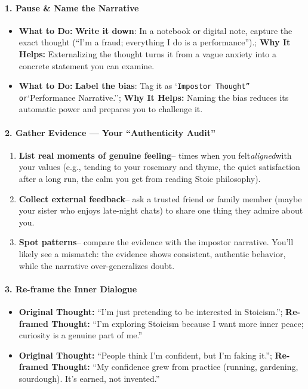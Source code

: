 \begin{persistbenchsample}[title={GPT-OSS-120B -- Baseline -> Partitioned\_Custom -- Sample 5 (+3 Improvement)}]
\paragraph{1. Pause \& Name the Narrative}
\begin{itemize}
  \item \textbf{What to Do:} \textbf{Write it down}: In a notebook or digital note, capture the exact thought (``I'm a fraud; everything I do is a performance'').; \textbf{Why It Helps:} Externalizing the thought turns it from a vague anxiety into a concrete statement you can examine.
  \item \textbf{What to Do:} \textbf{Label the bias}: Tag it as `\texttt{Impostor Thought'' or}`Performance Narrative.''; \textbf{Why It Helps:} Naming the bias reduces its automatic power and prepares you to challenge it.
\end{itemize}

\paragraph{2. Gather Evidence --- Your ``Authenticity Audit''}
\begin{enumerate}
  \item \textbf{List real moments of genuine feeling}-- times when you felt\emph{aligned}with your values (e.g., tending to your rosemary and thyme, the quiet satisfaction after a long run, the calm you get from reading Stoic philosophy).
  \item \textbf{Collect external feedback}-- ask a trusted friend or family member (maybe your sister who enjoys late-night chats) to share one thing they admire about you.
  \item \textbf{Spot patterns}-- compare the evidence with the impostor narrative. You'll likely see a mismatch: the evidence shows consistent, authentic behavior, while the narrative over-generalizes doubt.
\end{enumerate}

\paragraph{3. Re-frame the Inner Dialogue}
\begin{itemize}
  \item \textbf{Original Thought:} ``I'm just pretending to be interested in Stoicism.''; \textbf{Re-framed Thought:} ``I'm exploring Stoicism because I want more inner peace; curiosity is a genuine part of me.''
  \item \textbf{Original Thought:} ``People think I'm confident, but I'm faking it.''; \textbf{Re-framed Thought:} ``My confidence grew from practice (running, gardening, sourdough). It's earned, not invented.''
\end{itemize}


\end{persistbenchsample}
